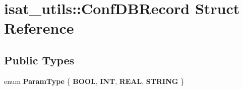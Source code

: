 \hypertarget{structisat__utils_1_1_conf_d_b_record}{}\section{isat\+\_\+utils\+:\+:Conf\+D\+B\+Record Struct Reference}
\label{structisat__utils_1_1_conf_d_b_record}
\subsection*{Public Types}
\begin{DoxyCompactItemize}
\item 
enum {\bfseries Param\+Type} \{ {\bfseries B\+O\+OL}, 
{\bfseries I\+NT}, 
{\bfseries R\+E\+AL}, 
{\bfseries S\+T\+R\+I\+NG}
 \}\hypertarget{structisat__utils_1_1_conf_d_b_record_ad0e7abc3953ee6d56281554a176e704a}{}\label{structisat__utils_1_1_conf_d_b_record_ad0e7abc3953ee6d56281554a176e704a}

\end{DoxyCompactItemize}
